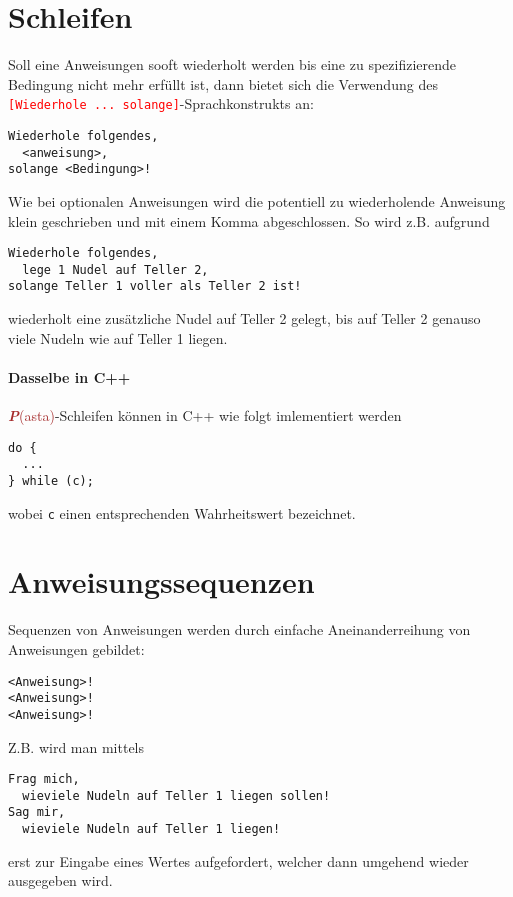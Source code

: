 \documentclass[11pt]{book}
\newcommand{\Pasta}{\textcolor{brown}{{\bf \em P}{\scriptsize{(asta)}}}}
\begin{document}
\section{Schleifen}

Soll eine Anweisungen sooft wiederholt werden bis eine zu spezifizierende Bedingung
nicht mehr erf\"ullt ist, dann bietet sich die Verwendung des
\textcolor{red}{\lstinline{[Wiederhole ... solange]}}-Sprachkonstrukts an: 
\color{red}
\begin{lstlisting}
Wiederhole folgendes,
  <anweisung>,
solange <Bedingung>!
\end{lstlisting}
\color{black}
Wie bei optionalen Anweisungen wird die potentiell zu wiederholende Anweisung 
klein geschrieben und mit einem Komma abgeschlossen.
So wird z.B. aufgrund
\color{blue}
\begin{lstlisting}
Wiederhole folgendes,
  lege 1 Nudel auf Teller 2,
solange Teller 1 voller als Teller 2 ist!
\end{lstlisting}
\color{black}
wiederholt eine zus\"atzliche Nudel auf Teller 2 gelegt, bis auf Teller 2 
genauso viele
Nudeln wie auf Teller 1 liegen.

\paragraph{Dasselbe in C++}
\Pasta-Schleifen k\"onnen in C++ wie folgt imlementiert werden
\begin{lstlisting}
do {
  ...
} while (c);
\end{lstlisting}
wobei \lstinline{c} einen entsprechenden Wahrheitswert
bezeichnet.

\section{Anweisungssequenzen}

Sequenzen von Anweisungen werden durch einfache Aneinanderreihung von Anweisungen
gebildet:
\color{red}
\begin{lstlisting}
<Anweisung>!
<Anweisung>!
<Anweisung>!
\end{lstlisting}
\color{black}
Z.B. wird man mittels
\color{blue}
\begin{lstlisting}
Frag mich,
  wieviele Nudeln auf Teller 1 liegen sollen!
Sag mir,
  wieviele Nudeln auf Teller 1 liegen!
\end{lstlisting}
\color{black}
erst zur Eingabe eines Wertes aufgefordert, welcher dann
umgehend wieder ausgegeben wird.
\end{document}
